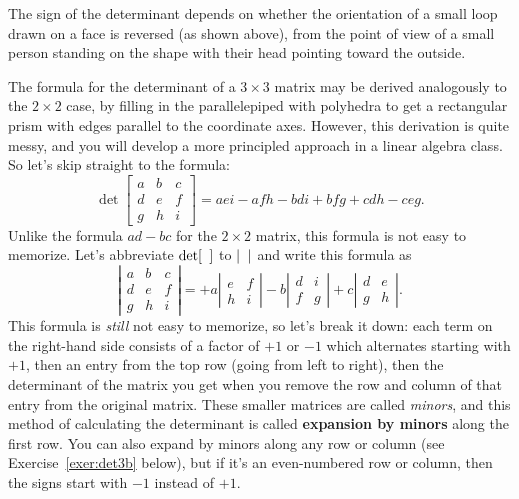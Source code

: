 \documentclass[svgnames]{report}
\begin{document}
The sign of the determinant depends on whether the orientation of a
small loop drawn on a face is reversed (as shown above), from the
point of view of a small person standing on the shape with their head
pointing toward the outside.

The formula for the determinant of a $3 \times 3$ matrix may be
derived analogously to the $2\times 2$ case, by filling in the
parallelepiped with polyhedra to get a rectangular prism with edges
parallel to the coordinate axes. However, this derivation is quite
messy, and you will develop a more principled approach in a linear
algebra class. So let's skip straight to the formula:
\[
\det \left[\begin{array}{ccc} a & b & c \\ d & e & f \\ g & h & i \end{array}\right] = 
aei - afh - bdi + bfg + cdh - ceg. 
\]
Unlike the formula $ad - bc$ for the $2\times 2$ matrix, this formula is not easy to memorize. Let's abbreviate $\det [ \hphantom{a} ]$ to $| \hphantom{a}|$ and write this formula as 
\[
\left|\begin{array}{ccc} a & b & c \\ d & e & f \\ g & h & i \end{array}\right| = 
+a \left|\begin{array}{cc} e & f \\  h & i \end{array}\right| 
-b \left|\begin{array}{cc} d & i \\  f & g \end{array}\right| 
+c \left|\begin{array}{cc} d & e \\  g & h \end{array}\right|. 
\]
This formula is \textit{still} not easy to memorize, so let's break it down: each term on the right-hand side consists of a factor of $+1$ or $-1$ which alternates starting with $+1$, then an entry from the top row (going from left to right), then the determinant of the matrix you get when you remove the row and column of that entry from the original matrix. These smaller matrices are called \textit{minors}, and this method of calculating the determinant is called \textbf{expansion by minors} along the first row. You can also expand by minors along any row or column (see Exercise~\ref{exer:det3b} below), but if it's an even-numbered row or column, then the signs start with $-1$ instead of $+1$. 
\end{document}

